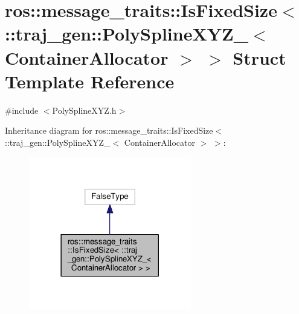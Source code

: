 \hypertarget{structros_1_1message__traits_1_1_is_fixed_size_3_01_1_1traj__gen_1_1_poly_spline_x_y_z___3_01_container_allocator_01_4_01_4}{}\section{ros\+:\+:message\+\_\+traits\+:\+:Is\+Fixed\+Size$<$ \+:\+:traj\+\_\+gen\+:\+:Poly\+Spline\+X\+Y\+Z\+\_\+$<$ Container\+Allocator $>$ $>$ Struct Template Reference}
\label{structros_1_1message__traits_1_1_is_fixed_size_3_01_1_1traj__gen_1_1_poly_spline_x_y_z___3_01_container_allocator_01_4_01_4}


{\ttfamily \#include $<$Poly\+Spline\+X\+Y\+Z.\+h$>$}



Inheritance diagram for ros\+:\+:message\+\_\+traits\+:\+:Is\+Fixed\+Size$<$ \+:\+:traj\+\_\+gen\+:\+:Poly\+Spline\+X\+Y\+Z\+\_\+$<$ Container\+Allocator $>$ $>$\+:
\nopagebreak
\begin{figure}[H]
\begin{center}
\leavevmode
\includegraphics[width=201pt]{structros_1_1message__traits_1_1_is_fixed_size_3_01_1_1traj__gen_1_1_poly_spline_x_y_z___3_01_cobbcc4722c4671c9c72a45e50c6d44bf0}
\end{center}
\end{figure}


